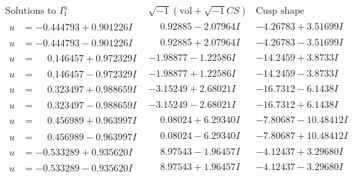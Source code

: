 \documentclass[1p]{elsarticle_modified}
\theoremstyle{definition}
\newcommand{\I}{\sqrt{-1}}
\begin{document}
$$\begin{array}{c|c|c}  
\text{Solutions to }I^u_{1}& \I (\text{vol} + \sqrt{-1}CS) & \text{Cusp shape}\\
 \hline 
\begin{aligned}
u &= -0.444793 + 0.901226 I\end{aligned}
 & \phantom{-}0.92885 - 2.07964 I & -4.26783 + 3.51699 I \\ \hline\begin{aligned}
u &= -0.444793 - 0.901226 I\end{aligned}
 & \phantom{-}0.92885 + 2.07964 I & -4.26783 - 3.51699 I \\ \hline\begin{aligned}
u &= \phantom{-}0.146457 + 0.972329 I\end{aligned}
 & -1.98877 - 1.22586 I & -14.2459 + 3.8733 I \\ \hline\begin{aligned}
u &= \phantom{-}0.146457 - 0.972329 I\end{aligned}
 & -1.98877 + 1.22586 I & -14.2459 - 3.8733 I \\ \hline\begin{aligned}
u &= \phantom{-}0.323497 + 0.988659 I\end{aligned}
 & -3.15249 + 2.68021 I & -16.7312 - 6.1438 I \\ \hline\begin{aligned}
u &= \phantom{-}0.323497 - 0.988659 I\end{aligned}
 & -3.15249 - 2.68021 I & -16.7312 + 6.1438 I \\ \hline\begin{aligned}
u &= \phantom{-}0.456989 + 0.963997 I\end{aligned}
 & \phantom{-}0.08024 + 6.29340 I & -7.80687 - 10.48412 I \\ \hline\begin{aligned}
u &= \phantom{-}0.456989 - 0.963997 I\end{aligned}
 & \phantom{-}0.08024 - 6.29340 I & -7.80687 + 10.48412 I \\ \hline\begin{aligned}
u &= -0.533289 + 0.935620 I\end{aligned}
 & \phantom{-}8.97543 - 1.96457 I & -4.12437 + 3.29680 I \\ \hline\begin{aligned}
u &= -0.533289 - 0.935620 I\end{aligned}
 & \phantom{-}8.97543 + 1.96457 I & -4.12437 - 3.29680 I \\ \hline\begin{aligned}

\end{aligned}
\end{array}$$
\end{document}
